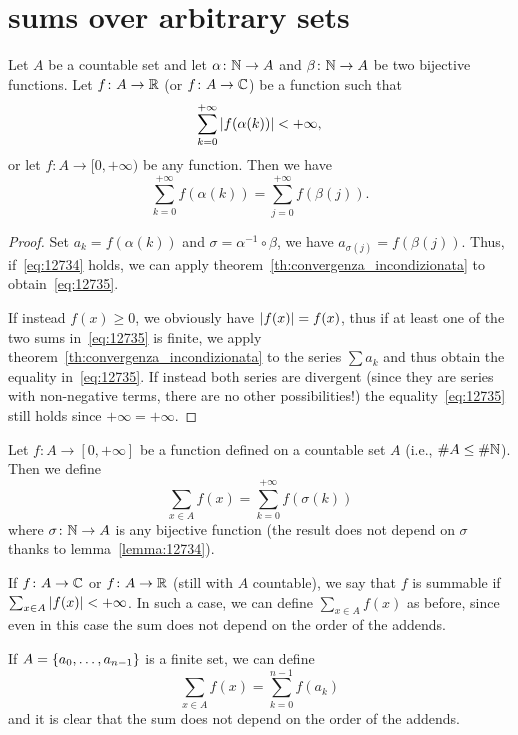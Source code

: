 \section{sums over arbitrary sets}
%
%

\begin{lemma}\label{lemma:12734}
  Let $A$ be a countable set and let 
  $\alpha\colon {\mathbb N}\to A$ and $\beta\colon {\mathbb N}\to A$ 
  be two bijective functions.
  Let $f\colon A\to {\mathbb R}$ (or 
  $f\colon A \to {\mathbb C}$) be a function such that 
  \begin{equation}\label{eq:12734}
    \sum_{k=0}^{+\infty} {\left|f(\alpha(k))\right|} < +\infty,  
  \end{equation}
  or let $f\colon A\to [0,+\infty)$ be any function. 
  Then we have
  \begin{equation}\label{eq:12735}
    \sum_{k=0}^{+\infty} f(\alpha(k)) =
    \sum_{j=0}^{+\infty} f(\beta(j)). 
  \end{equation}
\end{lemma}
%
\begin{proof}
Set $a_k=f(\alpha (k))$ and $\sigma = \alpha^{-1}\circ \beta$, we have 
$a_{\sigma(j)} = f(\beta (j))$.
Thus, if~\eqref{eq:12734} holds, we can 
apply theorem~\ref{th:convergenza_incondizionata}
to obtain~\eqref{eq:12735}.

If instead $f(x)\ge 0$, we obviously have ${\left|f(x)\right|}=f(x)$,
thus if at least one of the two sums in~\eqref{eq:12735}
is finite, we apply theorem~\ref{th:convergenza_incondizionata}
to the series $\sum a_k$ and thus obtain the equality 
in~\eqref{eq:12735}.
If instead both series are divergent
(since they are series with non-negative terms, there are no other
possibilities!)
the equality~\eqref{eq:12735} still holds
since $+\infty = +\infty$.
\end{proof}

\begin{definition}
Let $f\colon A\to [0,+\infty]$ be a function defined on a countable set 
$A$ (i.e., $\#A \le \#{\mathbb N}$).
Then we define
  \[
    \sum_{x\in A}f(x)
    = \sum_{k=0}^{+\infty} f(\sigma(k)) 
  \]
where $\sigma\colon {\mathbb N}\to A$ is any bijective function
(the result does not depend on $\sigma$ thanks to lemma~\ref{lemma:12734}).

If $f\colon A\to {\mathbb C}$ or $f\colon A\to {\mathbb R}$ (still with $A$ countable),
we say that $f$ is summable if $\sum_{x\in A}{\left|f(x)\right|}<+\infty$. 
In such a case, we can define $\sum_{x\in A} f(x)$ as before,
since even in this case the sum does not depend
on the order of the addends.

If $A={\left\{ a_0, \dots, a_{n-1} \right\}}$ is a finite set, we can define 
\[
  \sum_{x\in A} f(x) = \sum_{k=0}^{n-1} f(a_k)
\]
and it is clear that the sum does not depend on the order of the addends.
\end{definition}

